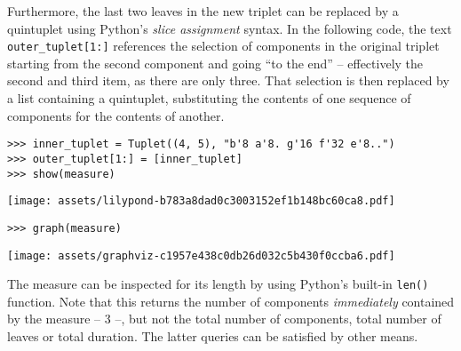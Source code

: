 \noindent Furthermore, the last two leaves in the new triplet can be replaced
by a quintuplet using Python's \emph{slice assignment} syntax. In the following
code, the text \texttt{outer\_tuplet[1:]} references the selection of
components in the original triplet starting from the second component and going
\enquote{to the end} -- effectively the second and third item, as there are
only three. That selection is then replaced by a list containing a quintuplet,
substituting the contents of one sequence of components for the contents of
another.

\begin{comment}
<abjad>
inner_tuplet = Tuplet((4, 5), "b'8 a'8. g'16 f'32 e'8..")
outer_tuplet[1:] = [inner_tuplet]
show(measure)
</abjad>
\end{comment}

\begin{abjadbookoutput}
\begin{singlespacing}
\vspace{-0.5\baselineskip}
\begin{verbatim}
>>> inner_tuplet = Tuplet((4, 5), "b'8 a'8. g'16 f'32 e'8..")
>>> outer_tuplet[1:] = [inner_tuplet]
>>> show(measure)
\end{verbatim}
\noindent\texttt{[image: assets/lilypond-b783a8dad0c3003152ef1b148bc60ca8.pdf]}
\end{singlespacing}
\end{abjadbookoutput}

\begin{comment}
<abjad>
graph(measure)
</abjad>
\end{comment}

\begin{abjadbookoutput}
\begin{singlespacing}
\vspace{-0.5\baselineskip}
\begin{verbatim}
>>> graph(measure)
\end{verbatim}
\noindent\texttt{[image: assets/graphviz-c1957e438c0db26d032c5b430f0ccba6.pdf]}
\end{singlespacing}
\end{abjadbookoutput}

\noindent The measure can be inspected for its length by using Python's
built-in \texttt{len()} function. Note that this returns the number of
components \emph{immediately} contained by the measure -- 3 --, but not the
total number of components, total number of leaves or total duration. The
latter queries can be satisfied by other means.


